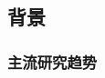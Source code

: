 \documentclass[../main.tex]{subfiles}
\begin{document}
\subsection{背景}
  \subsubsection{主流研究趋势}
\end{document}
